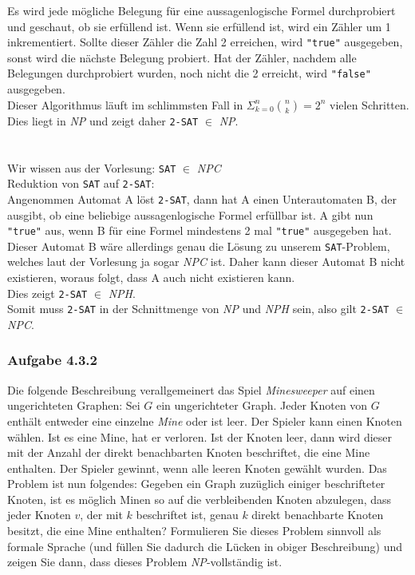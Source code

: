 \documentclass{article}
\begin{document}
Es wird jede mögliche Belegung für eine aussagenlogische Formel durchprobiert und geschaut, ob sie erfüllend ist.
Wenn sie erfüllend ist, wird ein Zähler um 1 inkrementiert.
Sollte dieser Zähler die Zahl 2 erreichen, wird \texttt{"true"} ausgegeben, sonst wird die nächste Belegung probiert.
Hat der Zähler, nachdem alle Belegungen durchprobiert wurden, noch nicht die 2 erreicht, wird \texttt{"false"} ausgegeben.\\
Dieser Algorithmus läuft im schlimmsten Fall in $\Sigma ^n_{k=0} \binom{n}{k} = 2^n$ vielen Schritten.\\
Dies liegt in \textit{NP} und zeigt daher \texttt{2-SAT} $\in$ \textit{NP}.\\
\\
\\
Wir wissen aus der Vorlesung: \texttt{SAT} $\in$ \textit{NPC}\\
Reduktion von \texttt{SAT} auf \texttt{2-SAT}:\\
Angenommen Automat A löst \texttt{2-SAT}, dann hat A einen Unterautomaten B, der ausgibt, ob eine beliebige aussagenlogische Formel erfüllbar ist.
A gibt nun \texttt{"true"} aus, wenn B für eine Formel mindestens 2 mal \texttt{"true"} ausgegeben hat.\\
Dieser Automat B wäre allerdings genau die Lösung zu unserem \texttt{SAT}-Problem, welches laut der Vorlesung ja sogar \textit{NPC} ist.
Daher kann dieser Automat B nicht existieren, woraus folgt, dass A auch nicht existieren kann.\\
Dies zeigt \texttt{2-SAT} $\in$ \textit{NPH}.\\
Somit muss \texttt{2-SAT} in der Schnittmenge von \textit{NP} und \textit{NPH} sein, also gilt \texttt{2-SAT} $\in$ \textit{NPC}.
\subsubsection{Aufgabe 4.3.2}
Die folgende Beschreibung verallgemeinert das Spiel \textit{Minesweeper} auf einen ungerichteten Graphen:
Sei $G$ ein ungerichteter Graph.
Jeder Knoten von $G$ enthält entweder eine einzelne \textit{Mine} oder ist leer.
Der Spieler kann einen Knoten wählen.
Ist es eine Mine, hat er verloren.
Ist der Knoten leer, dann wird dieser mit der Anzahl der direkt benachbarten Knoten beschriftet, die eine Mine enthalten.
Der Spieler gewinnt, wenn alle leeren Knoten gewählt wurden.
Das Problem ist nun folgendes: Gegeben ein Graph zuzüglich einiger beschrifteter Knoten, ist es möglich Minen so auf die verbleibenden Knoten abzulegen, dass jeder Knoten $v$, der mit $k$ beschriftet ist, genau $k$ direkt benachbarte Knoten besitzt, die eine Mine enthalten?
Formulieren Sie dieses Problem sinnvoll als formale Sprache (und füllen Sie dadurch die Lücken in obiger Beschreibung) und zeigen Sie dann, dass dieses Problem \textit{NP}-vollständig ist.
\vspace{1cm}\-\\



\end{document}
